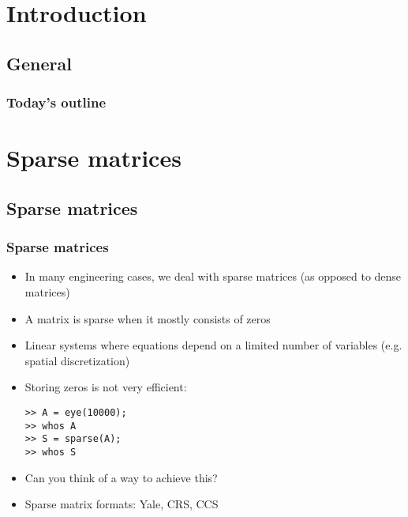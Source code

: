 \section{Introduction}
\subsection*{General}
\begin{frame}[label=contents_lin3]
  \frametitle{Today's outline}
\end{frame}

\section{Sparse matrices}
\subsection*{Sparse matrices}

\begin{frame}[fragile]
  \frametitle{Sparse matrices}
  \begin{itemize}
    \item In many engineering cases, we deal with sparse matrices (as opposed to dense matrices)
    \item A matrix is sparse when it mostly consists of zeros
    \item Linear systems where equations depend on a limited number of variables (e.g. spatial discretization)
    \item Storing zeros is not very efficient:
    \begin{lstlisting}
>> A = eye(10000);
>> whos A
>> S = sparse(A);
>> whos S
    \end{lstlisting}
    \item Can you think of a way to achieve this?
    \item Sparse matrix formats: Yale, CRS, CCS
\end{itemize}
\end{frame}

